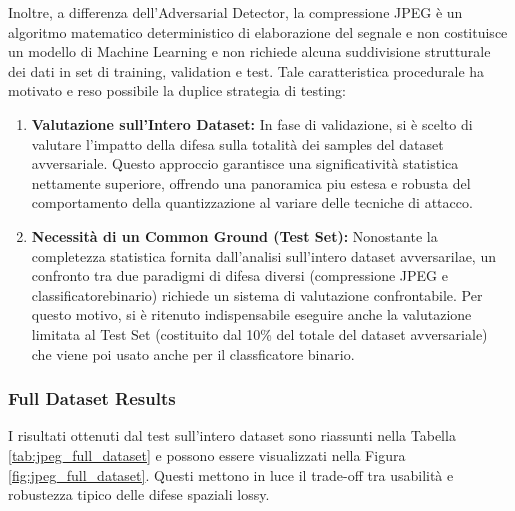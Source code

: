\documentclass[a4paper, 12pt]{article}
\begin{document}
Inoltre, a differenza dell'Adversarial Detector, 
la compressione JPEG è un algoritmo matematico deterministico di elaborazione del segnale e non costituisce 
un modello di Machine Learning e non richiede alcuna suddivisione strutturale dei dati in set di 
training, validation e test.
Tale caratteristica procedurale ha motivato e reso possibile la duplice strategia di testing:
\begin{enumerate}
    \item \textbf{Valutazione sull'Intero Dataset:} In fase di validazione, si è scelto di 
    valutare l'impatto della difesa sulla totalità dei samples del dataset avversariale. 
    Questo approccio garantisce una significatività statistica nettamente superiore, offrendo una panoramica 
    piu estesa e robusta del comportamento della quantizzazione al variare delle tecniche di attacco.
    \item \textbf{Necessità di un Common Ground (Test Set):} Nonostante la completezza statistica fornita 
    dall'analisi sull'intero dataset avversarilae, un confronto tra due paradigmi di difesa diversi 
    (compressione JPEG e classificatorebinario) richiede un sistema di valutazione confrontabile. 
    Per questo motivo, si è ritenuto indispensabile eseguire anche la 
    valutazione limitata al Test Set (costituito dal 10\% del totale del dataset avversariale) 
    che viene poi usato anche per il classficatore binario.
\end{enumerate}

\subsubsection{Full Dataset Results} 
I risultati ottenuti dal test sull'intero dataset sono riassunti nella Tabella \ref{tab:jpeg_full_dataset} 
e possono essere visualizzati nella Figura \ref{fig:jpeg_full_dataset}. Questi
mettono in luce il trade-off tra usabilità e robustezza tipico delle difese spaziali lossy.
\end{document}
